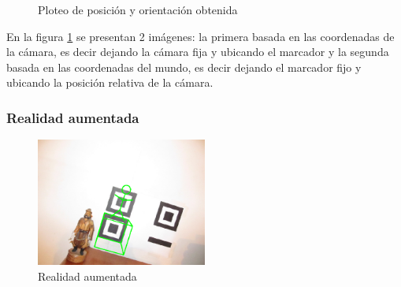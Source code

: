 \documentclass[main]{subfiles}
\begin{document}
\begin{figure}
  \begin{center}
  \end{center}
  \caption{Ploteo de posición y orientación obtenida}
  \label{fig:plots}  
\end{figure}

En la figura \ref{fig:plots} se presentan 2 imágenes: la primera basada en las coordenadas de la cámara, es decir dejando la cámara fija y ubicando el marcador y la segunda basada en las coordenadas del mundo, es decir dejando el marcador fijo y ubicando la posición relativa de la cámara.

\subsubsection*{Realidad aumentada}

\begin{figure}
	\begin{center}
		\includegraphics[width=0.5\textwidth]{./pics_camara/resultado_ar.png}
	\end{center}
	\caption{Realidad aumentada}
	\label{fig:resultado_ar}
\end{figure}
\end{document}
